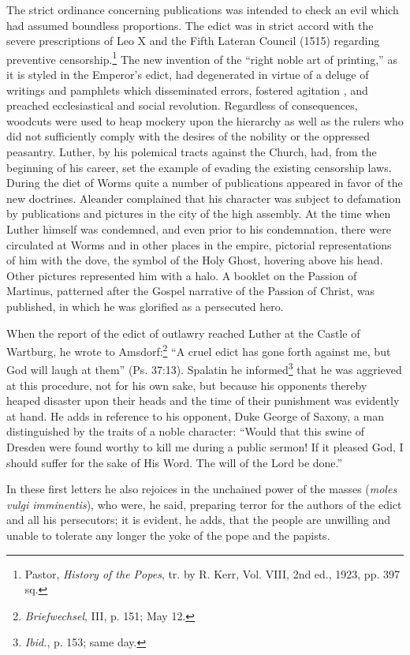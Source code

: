 The strict ordinance concerning publications was intended to
check an evil which had assumed boundless proportions. The edict
was in strict accord with the severe prescriptions of Leo X and the
Fifth Lateran Council (1515) regarding preventive censorship.\footnote
{Pastor, \textit{History of the Popes}, tr. by R. Kerr, Vol. VIII, 2nd ed., 1923, pp. 397 sq.}
The new invention of the “right noble art of printing,” as it is
styled in the Emperor’s edict, had degenerated in virtue of a deluge
of writings and pamphlets which disseminated errors, fostered agitation
, and preached ecclesiastical and social revolution. Regardless of
consequences, woodcuts were used to heap mockery upon the hierarchy
as well as the rulers who did not sufficiently comply with the
desires of the nobility or the oppressed peasantry. Luther, by his
polemical tracts against the Church, had, from the beginning of his
career, set the example of evading the existing censorship laws.
During the diet of Worms quite a number of publications appeared
in favor of the new doctrines. Aleander complained that his character
was subject to defamation by publications and pictures in the
city of the high assembly. At the time when Luther himself was
condemned, and even prior to his condemnation, there were circulated
at Worms and in other places in the empire, pictorial representations of
him with the dove, the symbol of the Holy Ghost, hovering above his head.
Other pictures represented him with a halo. A
booklet on the Passion of Martinus, patterned after the Gospel narrative
of the Passion of Christ, was published, in which he was
glorified as a persecuted hero.

When the report of the edict of outlawry reached Luther at the
Castle of Wartburg, he wrote to Amsdorf:\footnote{\textit{Briefwechsel}, III, p. 151; May 12.}
“A cruel edict has
gone forth against me, but God will laugh at them” (Ps. 37:13).
Spalatin he informed\footnote{\textit{Ibid.}, p. 153; same day.}
that he was aggrieved at this procedure, not
for his own sake, but because his opponents thereby heaped disaster
upon their heads and the time of their punishment was evidently
at hand. He adds in reference to his opponent, Duke George of
Saxony, a man distinguished by the traits of a noble character:
“Would that this swine of Dresden were found worthy to kill me
during a public sermon! If it pleased God, I should suffer for the
sake of His Word. The will of the Lord be done.”

In these first letters he also rejoices in the unchained power of
the masses (\textit{moles vulgi imminentis}), who were, he said, preparing
terror for the authors of the edict and all his persecutors; it is evident,
he adds, that the people are unwilling and unable to tolerate any
longer the yoke of the pope and the papists.

